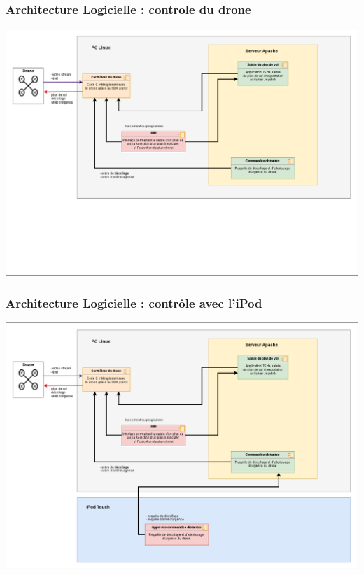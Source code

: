 \documentclass{beamer}
\begin{document}


	\begin{frame}
		
		\begin{center}
		\frametitle{Architecture Logicielle : controle du drone}

       
        \includegraphics[scale=0.24]{02_archi_logicielle_controle_drone.png}
		\end{center}
	\end{frame}
	

	\begin{frame}
		\begin{center}
		\frametitle{Architecture Logicielle : contrôle avec l'iPod}

       
        \includegraphics[scale=0.24]{03_archi_logicielle_iPod.png}
		\end{center}
	\end{frame}
\end{document}
